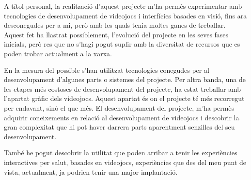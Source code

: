 \documentclass[12pt,a4paper,catalan]{article}
\begin{document}
	A títol personal, la realització d'aquest projecte m'ha permès experimentar amb tecnologies de desenvolupament de videojocs i interfícies basades en visió, fins ara desconegudes per a mi, però amb les quals tenia moltes ganes de treballar. Aquest fet ha llastrat possiblement, l'evolució del projecte en les seves fases inicials, però res que no s'hagi pogut suplir amb la diversitat de recursos que es poden trobar actualment a la xarxa.
	
	En la mesura del possible s'han utilitzat tecnologies conegudes per al desenvolupament d'algunes parts o sistemes del projecte.
	Per altra banda, una de les etapes més costoses de desenvolupament del projecte, ha estat treballar amb l'apartat gràfic dels videojocs. Aquest apartat és on el projecte té més recorregut per endavant, sinó el que més.
	El desenvolupament del projecte, m'ha permès adquirir coneixements en relació al desenvolupament de videojocs i descobrir la gran complexitat que hi pot haver darrera parts aparentment senzilles del seu desenvolupament.
	
	També he pogut descobrir la utilitat que poden arribar a tenir les experiències interactives per salut, basades en videojocs, experiències que des del meu punt de vista, actualment, ja podrien tenir una major implantació.
	
	\printbibliography[heading=bibnumbered,title={Referències}]
\end{document}
